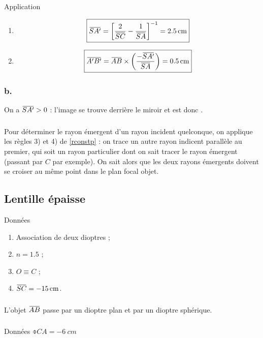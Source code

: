 \documentclass[10pt,a5paper,notitlepage]{book}
\begin{document}
\begin{NCexem}{Application}
    \begin{enumerate}
        \item \[ \boxed{\SAp = \left[ \frac{2}{\SC}- \frac{1}{\SA}\right]^{-1} =
            \SI{+2.5}{cm}}\]
        \item \[ \boxed{\ABp = \ABb\times \LR{-\SAp}{\SA} = \SI{0.5}{cm}} \]
    \end{enumerate}
\end{NCexem}

\setcounter{subsubsection}{1}
\subsubsection{b.}
On a $\SAp > 0$ : l'image se trouve derrière le miroir et est donc
.

\subsubsection{}
Pour déterminer le rayon émergent d'un rayon incident quelconque, on applique
les règles 3) et 4) de \ref{rconstp} : on trace un autre rayon indicent
parallèle au premier, qui soit un rayon particulier dont on sait tracer le rayon
émergent (passant par $C$ par exemple). On sait alors que les deux rayons
émergents doivent se croiser au même point dans le plan focal objet.

\subsection{Lentille épaisse}
\begin{NCdefi}{Données}
    \begin{enumerate}
        \item Association de deux dioptres ;
        \item $n = 1.5$ ;
        \item $O \equiv C$ ;
        \item $\SC = \SI{-15}{cm}$.
    \end{enumerate}
\end{NCdefi}

\subsubsection{}
L'objet $\ABb$ passe par un dioptre plan et par un dioptre sphérique.

\subsubsection{}
\begin{NCdefi}{Données}
    $\obar{CA} = \SI{-6}{cm}$
\end{NCdefi}
\end{document}
